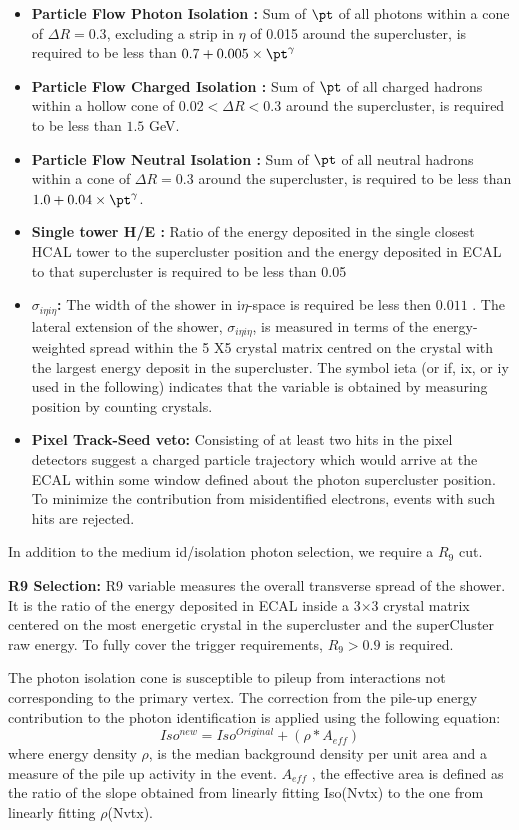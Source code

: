\begin{itemize}

\item {\bf Particle Flow Photon Isolation :} Sum of $\pt$ of all photons within a cone of $\Delta R = 0.3$, excluding a strip in $\eta$ of 0.015 around the supercluster, is required to be less than $0.7+0.005 \times \pt^{\gamma}$
\item {\bf Particle Flow Charged Isolation :} Sum of $\pt$ of all charged hadrons within a hollow cone of $0.02 < \Delta R < 0.3$ around the supercluster, is required to be less than $1.5$ GeV.
\item {\bf Particle Flow Neutral Isolation :} Sum of $\pt$ of all neutral hadrons within a cone of $\Delta R = 0.3$ around the supercluster, is required to be less than $1.0+0.04 \times \pt^{\gamma}$.
\item {\bf Single tower H/E :} Ratio of the energy deposited in the single closest HCAL tower to the supercluster position and the energy deposited in ECAL to that supercluster is required to be less than 0.05
\item {\bf $\sigma_{i{\eta}i{\eta}}$:} The width of the shower in i{$\eta$}-space is required be less then $0.011$ . The lateral extension of the shower, $\sigma_{i\eta i\eta}$, is measured in terms of the energy-weighted spread within the 5 X5 crystal matrix centred on the crystal with the largest energy deposit in the supercluster. The symbol ieta (or if, ix, or iy used in the following) indicates that the variable is obtained by measuring position by counting crystals.
\item {\bf Pixel Track-Seed veto:} Consisting of at least two hits in the pixel detectors suggest a charged particle trajectory which would arrive at the ECAL within some window defined about the photon supercluster position. To minimize the contribution from misidentified electrons, events with such hits are rejected.
\end{itemize}

In addition to the medium id/isolation photon selection, we require a $R_9$ cut.

{\bf R9 Selection:} R9 variable measures the overall transverse spread of the shower. It is the ratio of the energy deposited in ECAL inside a 3$\times$3 crystal matrix centered on the most energetic crystal in the supercluster and the superCluster raw energy. To fully cover the trigger requirements, $R_9 > 0.9$ is required. 

The photon isolation cone is susceptible to pileup from interactions not corresponding to the primary vertex. The correction from the pile-up energy contribution to the photon identification is applied using the following equation:
\begin{equation}
Iso^{new}  = Iso^{Original} + (\rho * A_{eff})
\end{equation}
where energy density $\rho$, is the median background density per unit area and a measure of the pile up activity in the event. $A_{eff}$ , the effective area is defined as the ratio of the slope obtained from linearly fitting Iso(Nvtx) to the one from linearly fitting $\rho$(Nvtx). 

